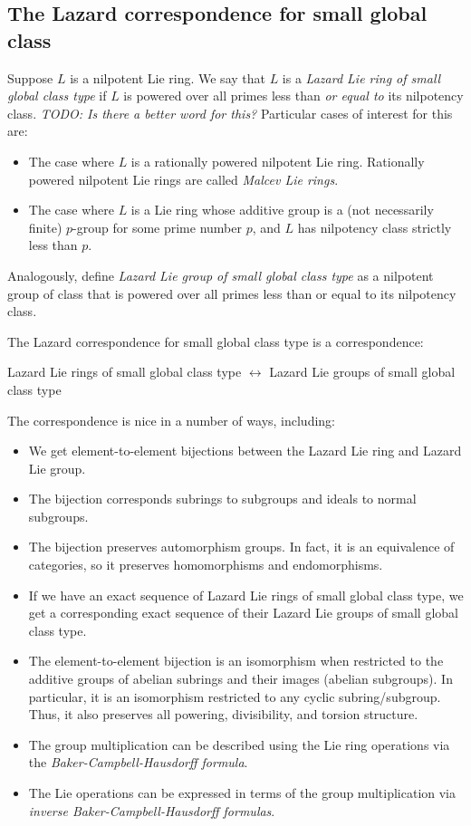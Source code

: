 \subsection{The Lazard correspondence for small global class}

Suppose $L$ is a nilpotent Lie ring. We say that $L$ is a {\em Lazard
  Lie ring of small global class type} if $L$ is powered over all
primes less than {\em or equal to} its nilpotency class. {\em TODO: Is
  there a better word for this?} Particular cases of interest for this
are:

\begin{itemize}
\item The case where $L$ is a rationally powered nilpotent Lie
  ring. Rationally powered nilpotent Lie rings are called {\em Malcev
    Lie rings}.
\item The case where $L$ is a Lie ring whose additive group is a (not
  necessarily finite) $p$-group for some prime number $p$, and $L$ has
  nilpotency class strictly less than $p$. 
\end{itemize}

Analogously, define {\em Lazard Lie group of small global class type}
as a nilpotent group of class that is powered over all primes less
than or equal to its nilpotency class.

The Lazard correspondence for small global class type is a
correspondence:

Lazard Lie rings of small global class type $\leftrightarrow$ Lazard
Lie groups of small global class type

The correspondence is nice in a number of ways, including:

\begin{itemize}
\item We get element-to-element bijections between the Lazard Lie ring
  and Lazard Lie group.
\item The bijection corresponds subrings to subgroups and ideals to
  normal subgroups.
\item The bijection preserves automorphism groups. In fact, it is an
  equivalence of categories, so it preserves homomorphisms and
  endomorphisms.
\item If we have an exact sequence of Lazard Lie rings of small global
  class type, we get a corresponding exact sequence of their Lazard
  Lie groups of small global class type.
\item The element-to-element bijection is an isomorphism when
  restricted to the additive groups of abelian subrings and their
  images (abelian subgroups). In particular, it is an isomorphism
  restricted to any cyclic subring/subgroup. Thus, it also preserves
  all powering, divisibility, and torsion structure.
\item The group multiplication can be described using the Lie ring
  operations via the {\em Baker-Campbell-Hausdorff formula}.
\item The Lie operations can be expressed in terms of the group
  multiplication via {\em inverse Baker-Campbell-Hausdorff formulas}.
\end{itemize}

